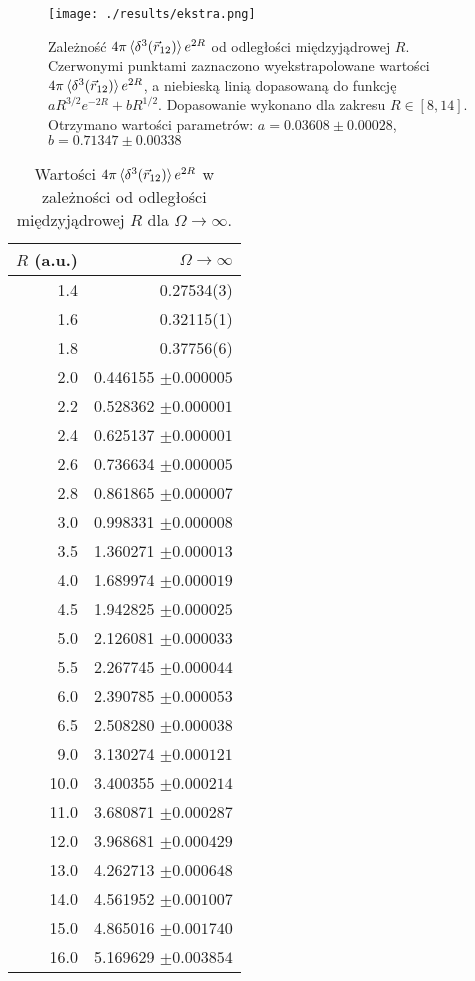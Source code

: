 \documentclass[a4paper,12pt]{article}
\numberwithin{equation}{section}
\numberwithin{table}{section}
\numberwithin{figure}{section}
\begin{document}
\begin{figure}[h!] 
\label{fig:r}
  \centering
    \texttt{[image: ./results/ekstra.png]}
    \caption{Zależność $4\pi\braket{\delta^3(\vec{r}_{12})}e^{2R}$ od odległości międzyjądrowej $R$. Czerwonymi punktami zaznaczono wyekstrapolowane wartości $4\pi\braket{\delta^3(\vec{r}_{12})}e^{2R}$, a niebieską linią dopasowaną do funkcję $a R^{3/2} e^{-2R}+b R^{1/2}$. Dopasowanie wykonano dla zakresu $R \in [8,14]$. Otrzymano wartości parametrów: $a = 0.03608 \pm 0.00028 $, $b = 0.71347\pm 0.00338$ }
\end{figure}
\begin{table}\begin{center}
\begin{tabular*}{0.6\textwidth}[h!]{@{\extracolsep{\fill} }r r} 
$R$ (a.u.) & \multicolumn{1}{r}{$\Omega \rightarrow \infty $}\\
  \hline \hline
1.4&	0.27534(3)\\
1.6&	0.32115(1)\\
1.8&	0.37756(6)\\
2.0&	0.446155 $\pm 0.000005$\\
2.2&	0.528362 $\pm 0.000001$\\
2.4&	0.625137 $\pm 0.000001$\\
2.6&	0.736634 $\pm 0.000005$\\
2.8&	0.861865 $\pm 0.000007$\\
3.0&	0.998331 $\pm 0.000008$\\
3.5&	1.360271 $\pm 0.000013$\\
4.0&	1.689974 $\pm 0.000019$\\
4.5&	1.942825 $\pm 0.000025$\\
5.0&	2.126081 $\pm 0.000033$\\
5.5&	2.267745 $\pm 0.000044$\\
6.0&	2.390785 $\pm 0.000053$\\
6.5&	2.508280 $\pm 0.000038$\\
9.0&	3.130274 $\pm 0.000121$\\
10.0&	3.400355 $\pm 0.000214$\\
11.0&	3.680871 $\pm 0.000287$\\
12.0& 3.968681 $\pm 0.000429$\\
13.0&	4.262713 $\pm 0.000648$\\
14.0&	4.561952 $\pm 0.001007$\\
15.0&	4.865016 $\pm 0.001740$\\
16.0& 5.169629 $\pm 0.003854$\\
 \hline
\end{tabular*} \caption{Wartości $4\pi\braket{\delta^3(\vec{r}_{12})}e^{2R}$ w zależności od odległości międzyjądrowej $R$ dla $\Omega \rightarrow \infty$.}\end{center}
\label{tab:ekstrapolacja}
\end{table}
\end{document}
